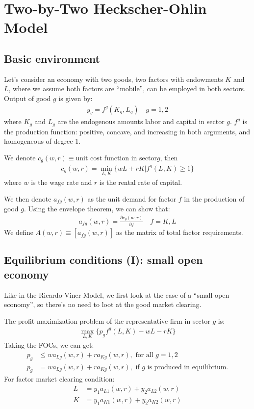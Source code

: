 \section{Two-by-Two Heckscher-Ohlin Model}

\subsection{Basic environment}

Let's consider an economy with two goods, two factors with endowments $K$ and $L$, where we assume both factors are ``mobile'', can be employed in both sectors.
Output of good $g$ is given by:
\begin{gather*}
    y_g = f^g(K_g, L_g) \quad g = 1,2
\end{gather*}
where $K_g$ and $L_g$ are the endogenous amounts labor and capital in
sector $g$.
$f^g$ is the production function: positive, concave, and increasing in both arguments, and homogeneous of degree 1.

We denote $c_g(w, r) \equiv \text{unit cost function in sector} g$,
then
\begin{gather*}
    c_g(w, r) = \min_{L, K}\{  wL + rK | f^g(L, K) \geq 1\}
\end{gather*}
where $w$ is the wage rate and $r$ is the rental rate of capital.

We then denote $a_{fg} (w,r)$ as the unit demand for factor $f$ in the production of good $g$.
Using the envelope theorem, we can show that:
\begin{gather*}
    a_{fg}(w,r) = \frac{\partial c_g(w,r)}{\partial f} \quad f = K, L
\end{gather*}
We define $A(w,r) \equiv [a_{fg} (w,r)]$ as the matrix of total factor requirements.

\subsection{Equilibrium conditions (I): small open economy}

Like in the Ricardo-Viner Model, we first look at the case of a ``small open
economy'', so there's no need to loot at the good market clearing.

The profit maximization problem of the representative firm in sector $g$ is:
\begin{gather*}
    \max_{L, K} \{ p_g f^g(L, K) - wL - rK \}
\end{gather*}
Taking the FOCs, we can get:
\begin{align*}
    p_g & \leq w a_{Lg}(w,r) + r a_{Kg}(w,r), \text{ for all } g=1,2 \\
    p_g &= w a_{Lg}(w,r) + r a_{Kg}(w,r), \text{ if $g$ is produced in equilibrium.} \tag{Zero-Profit Condition}
\end{align*}
For factor market clearing condition:
\begin{align*}
    L &= y_1 a_{L1}(w,r) + y_2 a_{L2}(w,r) \\
    K &= y_1 a_{K1}(w,r) + y_2 a_{K2}(w,r)
\end{align*}

